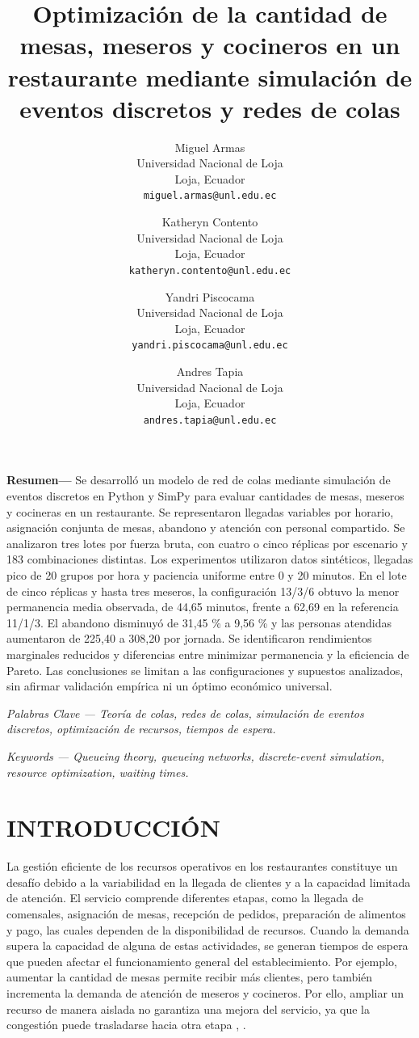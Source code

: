 \documentclass[10pt,a4paper,twocolumn]{article}
\title{Optimización de la cantidad de mesas, meseros y cocineros en un restaurante mediante simulación de eventos discretos y redes de colas}
\author{\begin{tabular}{c}Miguel Armas\\Universidad Nacional de Loja\\Loja, Ecuador\\\small\texttt{miguel.armas@unl.edu.ec}\end{tabular} \and \begin{tabular}{c}Katheryn Contento\\Universidad Nacional de Loja\\Loja, Ecuador\\\small\texttt{katheryn.contento@unl.edu.ec}\end{tabular} \and \begin{tabular}{c}Yandri Piscocama\\Universidad Nacional de Loja\\Loja, Ecuador\\\small\texttt{yandri.piscocama@unl.edu.ec}\end{tabular} \and \begin{tabular}{c}Andres Tapia\\Universidad Nacional de Loja\\Loja, Ecuador\\\small\texttt{andres.tapia@unl.edu.ec}\end{tabular}}
\date{}
\begin{document}
\maketitle
\noindent\textbf{Resumen---} Se desarrolló un modelo de red de colas mediante simulación de eventos discretos en Python y SimPy para evaluar cantidades de mesas, meseros y cocineras en un restaurante. Se representaron llegadas variables por horario, asignación conjunta de mesas, abandono y atención con personal compartido. Se analizaron tres lotes por fuerza bruta, con cuatro o cinco réplicas por escenario y 183 combinaciones distintas. Los experimentos utilizaron datos sintéticos, llegadas pico de 20 grupos por hora y paciencia uniforme entre 0 y 20 minutos. En el lote de cinco réplicas y hasta tres meseros, la configuración 13/3/6 obtuvo la menor permanencia media observada, de 44,65 minutos, frente a 62,69 en la referencia 11/1/3. El abandono disminuyó de 31,45 \% a 9,56 \% y las personas atendidas aumentaron de 225,40 a 308,20 por jornada. Se identificaron rendimientos marginales reducidos y diferencias entre minimizar permanencia y la eficiencia de Pareto. Las conclusiones se limitan a las configuraciones y supuestos analizados, sin afirmar validación empírica ni un óptimo económico universal.

\noindent\textit{Palabras Clave — Teoría de colas, redes de colas, simulación de eventos discretos, optimización de recursos, tiempos de espera.}

\noindent\textit{Keywords — Queueing theory, queueing networks, discrete-event simulation, resource optimization, waiting times.}

\section{INTRODUCCIÓN}

La gestión eficiente de los recursos operativos en los restaurantes constituye un desafío debido a la variabilidad en la llegada de clientes y a la capacidad limitada de atención. El servicio comprende diferentes etapas, como la llegada de comensales, asignación de mesas, recepción de pedidos, preparación de alimentos y pago, las cuales dependen de la disponibilidad de recursos. Cuando la demanda supera la capacidad de alguna de estas actividades, se generan tiempos de espera que pueden afectar el funcionamiento general del establecimiento. Por ejemplo, aumentar la cantidad de mesas permite recibir más clientes, pero también incrementa la demanda de atención de meseros y cocineros. Por ello, ampliar un recurso de manera aislada no garantiza una mejora del servicio, ya que la congestión puede trasladarse hacia otra etapa \cite{ref2}, \cite{ref9}.
\end{document}
